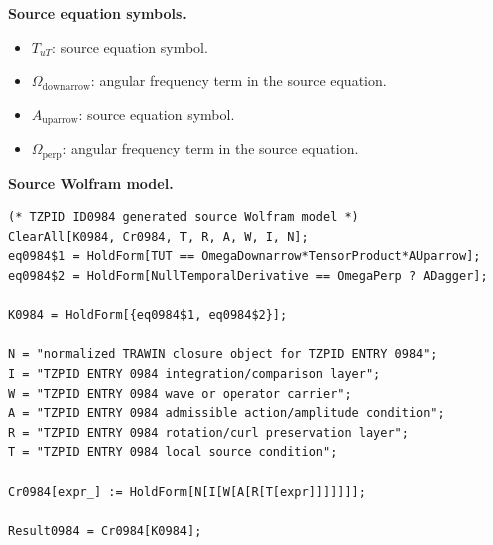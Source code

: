 \begin{minipage}[t]{0.49\linewidth}
\begingroup
\small
\raggedright
\textbf{Source equation symbols.}\par
\begin{itemize}[leftmargin=1.35em,itemsep=1pt,topsep=1pt,parsep=0pt]
    \item $T_{uT}$: source equation symbol.
    \item $\Omega_{\mathrm{downarrow}}$: angular frequency term in the source equation.
    \item $A_{\mathrm{uparrow}}$: source equation symbol.
    \item $\Omega_{\mathrm{perp}}$: angular frequency term in the source equation.
\end{itemize}
\endgroup
\end{minipage}\hfill
\begin{minipage}[t]{0.47\linewidth}
\begingroup
\scriptsize
\raggedright
\textbf{Source Wolfram model.}\par
\begin{Verbatim}[fontsize=\tiny,breaklines=true,breakanywhere=true]
(* TZPID ID0984 generated source Wolfram model *)
ClearAll[K0984, Cr0984, T, R, A, W, I, N];
eq0984$1 = HoldForm[TUT == OmegaDownarrow*TensorProduct*AUparrow];
eq0984$2 = HoldForm[NullTemporalDerivative == OmegaPerp ? ADagger];

K0984 = HoldForm[{eq0984$1, eq0984$2}];

N = "normalized TRAWIN closure object for TZPID ENTRY 0984";
I = "TZPID ENTRY 0984 integration/comparison layer";
W = "TZPID ENTRY 0984 wave or operator carrier";
A = "TZPID ENTRY 0984 admissible action/amplitude condition";
R = "TZPID ENTRY 0984 rotation/curl preservation layer";
T = "TZPID ENTRY 0984 local source condition";

Cr0984[expr_] := HoldForm[N[I[W[A[R[T[expr]]]]]]];

Result0984 = Cr0984[K0984];
\end{Verbatim}
\endgroup
\end{minipage}


